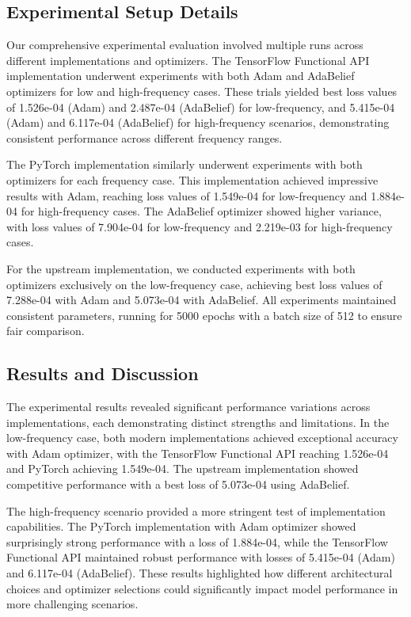 \documentclass[10pt,journal,compsoc,onecolumn]{IEEEtran}
\begin{document}
\subsection{Experimental Setup Details}
Our comprehensive experimental evaluation involved multiple runs across different implementations and optimizers. The TensorFlow Functional API implementation underwent experiments with both Adam and AdaBelief optimizers for low and high-frequency cases. These trials yielded best loss values of 1.526e-04 (Adam) and 2.487e-04 (AdaBelief) for low-frequency, and 5.415e-04 (Adam) and 6.117e-04 (AdaBelief) for high-frequency scenarios, demonstrating consistent performance across different frequency ranges.

The PyTorch implementation similarly underwent experiments with both optimizers for each frequency case. This implementation achieved impressive results with Adam, reaching loss values of 1.549e-04 for low-frequency and 1.884e-04 for high-frequency cases. The AdaBelief optimizer showed higher variance, with loss values of 7.904e-04 for low-frequency and 2.219e-03 for high-frequency cases.

For the upstream implementation, we conducted experiments with both optimizers exclusively on the low-frequency case, achieving best loss values of 7.288e-04 with Adam and 5.073e-04 with AdaBelief. All experiments maintained consistent parameters, running for 5000 epochs with a batch size of 512 to ensure fair comparison.

\subsection{Results and Discussion}
The experimental results revealed significant performance variations across implementations, each demonstrating distinct strengths and limitations. In the low-frequency case, both modern implementations achieved exceptional accuracy with Adam optimizer, with the TensorFlow Functional API reaching 1.526e-04 and PyTorch achieving 1.549e-04. The upstream implementation showed competitive performance with a best loss of 5.073e-04 using AdaBelief.

The high-frequency scenario provided a more stringent test of implementation capabilities. The PyTorch implementation with Adam optimizer showed surprisingly strong performance with a loss of 1.884e-04, while the TensorFlow Functional API maintained robust performance with losses of 5.415e-04 (Adam) and 6.117e-04 (AdaBelief). These results highlighted how different architectural choices and optimizer selections could significantly impact model performance in more challenging scenarios.
\end{document}
